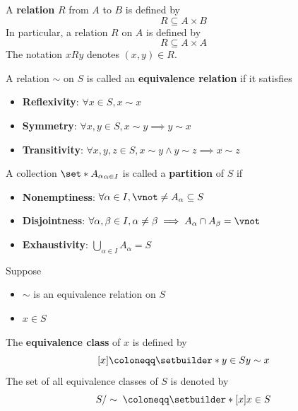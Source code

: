 \begin{definition} \label{an1:def:relation}
  A \textbf{relation} $R$ from $A$ to $B$ is defined by
  \[
    R \subseteq A \times B
  \]
  In particular, a relation $R$ on $A$ is defined by
  \[
    R \subseteq A \times A
  \]
  The notation $xRy$ denotes $(x, y) \in R$.
\end{definition}

\begin{definition} \label{an1:def:equivalence-relation}
  A relation $\sim$ on $S$ is called an \textbf{equivalence relation} if it satisfies
  \begin{itemize}
    \item \textbf{Reflexivity}: $\forall x \in S, x \sim x$
    \item \textbf{Symmetry}: $\forall x, y \in S, x \sim y \implies y \sim x$
    \item \textbf{Transitivity}: $\forall x, y, z \in S, x \sim y \land y \sim z \implies x \sim z$
  \end{itemize}
\end{definition}

\begin{definition} \label{an1:def:partition}
  A collection $\set*{A_{\alpha}}_{\alpha \in I}$ is called a \textbf{partition} of $S$ if
  \begin{itemize}
    \item \textbf{Nonemptiness}: $\forall \alpha \in I, \vnot \neq A_{\alpha} \subseteq S$
    \item \textbf{Disjointness}: $\forall \alpha, \beta \in I, \alpha \neq \beta \implies A_{\alpha} \cap A_{\beta} = \vnot$
    \item \textbf{Exhaustivity}: $\bigcup_{\alpha \in I} A_{\alpha} = S$
  \end{itemize}
\end{definition}

\begin{definition} \label{an1:def:equivalence-class}
  Suppose
  \begin{itemize}
    \item $\sim$ is an equivalence relation on $S$
    \item $x \in S$
  \end{itemize}
  The \textbf{equivalence class} of $x$ is defined by
  \[
    [x] \coloneqq \setbuilder*{y \in S}{y \sim x}
  \]
  The set of all equivalence classes of $S$ is denoted by
  \[
    S / \sim \; \coloneqq \setbuilder*{[x]}{x \in S}
  \]
\end{definition}

